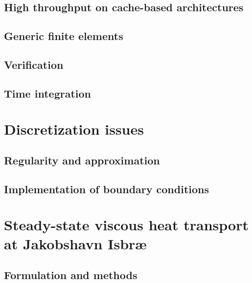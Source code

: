 \documentclass[a4paper,twoside,11pt,pdftex]{report}
\begin{document}
\section{High throughput on cache-based architectures}\label{sec:throughput}


\section{Generic finite elements}\label{sec:femassembly}


\section{Verification}\label{sec:verification}


\section{Time integration}\label{sec:timestep}


\cleardoublepage
\chapter{Discretization issues}\label{chap:discretization}

\section{Regularity and approximation}\label{sec:regularity}


\section{Implementation of boundary conditions}\label{sec:slip}


\cleardoublepage
% 

\chapter{Steady-state viscous heat transport at Jakobshavn Isbr{\ae}}\label{chap:jakobshavn}
\section{Formulation and methods}\label{sec:vht}

\end{document}
